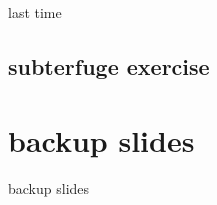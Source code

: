\date{}
\title{}
\date{}

\begin{frame}
    \titlepage
\end{frame}



\begin{frame}{last time}
\end{frame}

\subsection{subterfuge exercise}







\section{backup slides}
\begin{frame}{backup slides}
\end{frame}


